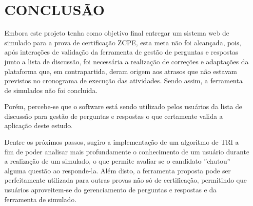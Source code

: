 \chapter{CONCLUSÃO}
\label{chp:conclusao}

Embora este projeto tenha como objetivo final entregar um sistema web de simulado
para a prova de certificação \acs{ZCPE}, esta meta não foi alcançada, pois, 
após interações de validação da ferramenta de gestão de perguntas e
respostas junto a lista de discussão, foi necessária a realização de correções e
adaptações da plataforma que, em contrapartida, deram origem aos atrasos que não
estavam previstos no cronograma de execução das atividades. Sendo assim, a
ferramenta de simulados não foi concluída.

Porém, percebe-se que o software está sendo utilizado pelos usuários da lista
de discussão para gestão de perguntas e respostas o que certamente valida a
aplicação deste estudo.

Dentre os próximos passos, sugiro a implementação de um algoritmo de \ac{TRI} a
fim de poder analisar mais profundamente o conhecimento de um usuário durante a
realização de um simulado, o que permite avaliar se o candidato ''chutou''
alguma questão ao responde-la. Além disto, a ferramenta proposta pode ser perfeitamente
utilizada para outras provas não só de certificação, permitindo que usuários
aproveitem-se do gerenciamento de perguntas e respostas e da ferramenta de
simulado.